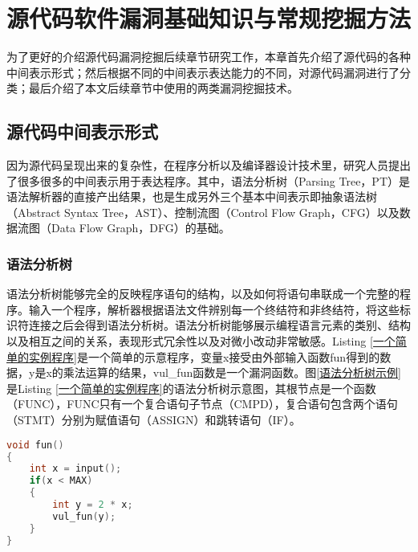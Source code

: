 \chapter{源代码软件漏洞基础知识与常规挖掘方法}

为了更好的介绍源代码漏洞挖掘后续章节研究工作，本章首先介绍了源代码的各种中间表示形式；然后根据不同的中间表示表达能力的不同，对源代码漏洞进行了分类；最后介绍了本文后续章节中使用的两类漏洞挖掘技术。

%

\section{源代码中间表示形式}

因为源代码呈现出来的复杂性，在程序分析以及编译器设计技术里，研究人员提出了很多很多的中间表示用于表达程序。其中，语法分析树（Parsing Tree，PT）是语法解析器的直接产出结果，也是生成另外三个基本中间表示即抽象语法树（Abstract Syntax Tree，AST）、控制流图（Control Flow Graph，CFG）以及数据流图（Data Flow Graph，DFG）的基础。

\subsection{语法分析树}

语法分析树能够完全的反映程序语句的结构，以及如何将语句串联成一个完整的程序。输入一个程序，解析器根据语法文件辨别每一个终结符和非终结符，将这些标识符连接之后会得到语法分析树。语法分析树能够展示编程语言元素的类别、结构以及相互之间的关系，表现形式冗余性以及对微小改动非常敏感。Listing \ref{一个简单的实例程序}是一个简单的示意程序，变量x接受由外部输入函数fun得到的数据，y是x的乘法运算的结果，vul\_fun函数是一个漏洞函数。图\ref{语法分析树示例}是Listing \ref{一个简单的实例程序}的语法分析树示意图，其根节点是一个函数{（FUNC）}，FUNC只有一个复合语句子节点{（CMPD）}，复合语句包含两个语句{（STMT）}分别为赋值语句{（ASSIGN）}和跳转语句{（IF）}。

\begin{lstlisting}[language=C,caption=一个简单的实例程序,label=一个简单的实例程序]
void fun()
{
	int x = input();
	if(x < MAX)
	{
		int y = 2 * x;
		vul_fun(y);
	}
}
\end{lstlisting}

